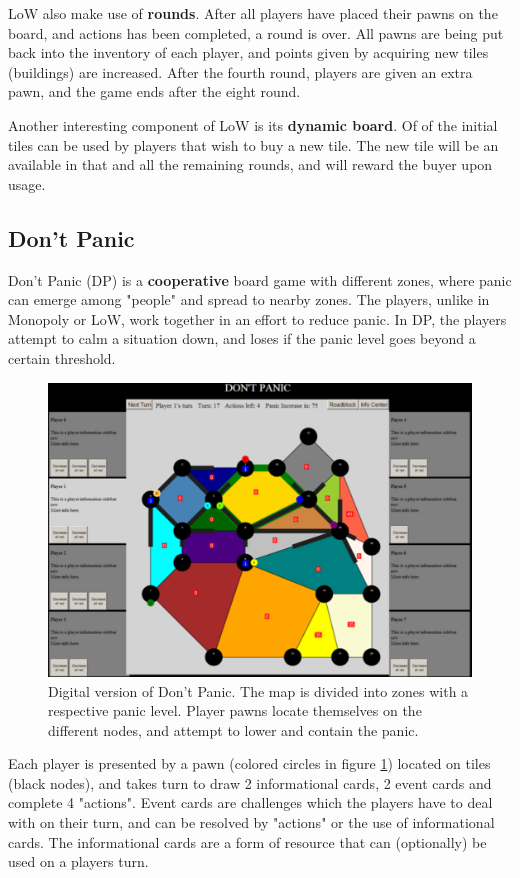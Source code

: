 LoW also make use of \textbf{rounds}. After all players have placed their pawns on the board, and actions has been completed, a round is over. All pawns are being put back into the inventory of each player, and points given by acquiring new tiles (buildings) are increased. After the fourth round, players are given an extra pawn, and the game ends after the eight round.

Another interesting component of LoW is its \textbf{dynamic board}. Of of the initial tiles can be used by players that wish to buy a new tile. The new tile will be an available in that and all the remaining rounds, and will reward the buyer upon usage.

\subsection{Don't Panic}
Don't Panic (DP) is a \textbf{cooperative} board game with different zones, where panic can emerge among "people" and spread to nearby zones. The players, unlike in Monopoly or LoW, work together in an effort to reduce panic. In DP, the players attempt to calm a situation down, and loses if the panic level goes beyond a certain threshold.

\begin{figure}[ht]
\includegraphics[width=12cm]{img/dont_panic_interface}
\centering
\caption{Digital version of Don't Panic. The map is divided into zones with a respective panic level. Player pawns locate themselves on the different nodes, and attempt to lower and contain the panic.}
\label{fig:dont_panic_board}
\end{figure}

Each player is presented by a pawn (colored circles in figure \ref{fig:dont_panic_board}) located on tiles (black nodes), and takes turn to draw 2 informational cards, 2 event cards and complete 4 "actions". Event cards are challenges which the players have to deal with on their turn, and can be resolved by "actions" or the use of informational cards. The informational cards are a form of resource that can (optionally) be used on a players turn. 

